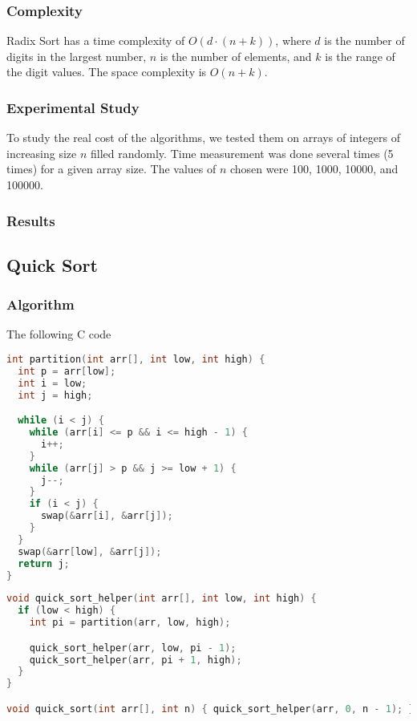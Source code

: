 \documentclass{article}
\begin{document}
\subsubsection{Complexity}
Radix Sort has a time complexity of $O(d \cdot (n + k))$, where $d$ is the number of digits in the largest number, $n$ is the number of elements, and $k$ is the range of the digit values. The space complexity is $O(n + k)$.

\subsubsection{Experimental Study}
To study the real cost of the algorithms, we tested them on arrays of integers of increasing size $n$ filled randomly. Time measurement was done several times (5 times) for a given array size. The values of $n$ chosen were 100, 1000, 10000, and 100000.

\subsubsection{Results}
\begin{figure}[ht]
\end{figure}


\subsection{Quick Sort}

\subsubsection{Algorithm}
The following C code

\newpage
\begin{lstlisting}[language=C, caption=Matrix Multiplication]
int partition(int arr[], int low, int high) {
  int p = arr[low];
  int i = low;
  int j = high;

  while (i < j) {
    while (arr[i] <= p && i <= high - 1) {
      i++;
    }
    while (arr[j] > p && j >= low + 1) {
      j--;
    }
    if (i < j) {
      swap(&arr[i], &arr[j]);
    }
  }
  swap(&arr[low], &arr[j]);
  return j;
}
\end{lstlisting}

\begin{lstlisting}[language=C, caption=Matrix Multiplication]
void quick_sort_helper(int arr[], int low, int high) {
  if (low < high) {
    int pi = partition(arr, low, high);

    quick_sort_helper(arr, low, pi - 1);
    quick_sort_helper(arr, pi + 1, high);
  }
}

void quick_sort(int arr[], int n) { quick_sort_helper(arr, 0, n - 1); }
\end{lstlisting}
\end{document}
